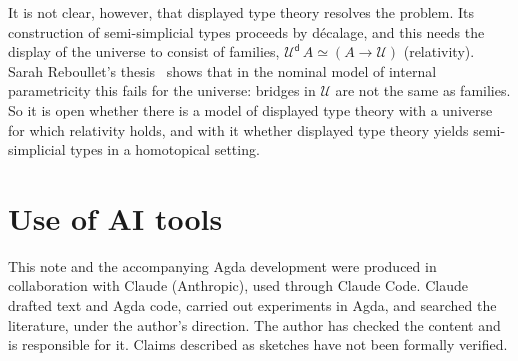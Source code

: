 \documentclass[11pt]{article}
\begin{document}
It is not clear, however, that displayed type theory resolves the problem.
Its construction of semi-simplicial types proceeds by d\'ecalage, and this
needs the display of the universe to consist of families,
$\mathcal U^{\mathsf d}\,A \simeq (A \to \mathcal U)$ (relativity). Sarah
Reboullet's thesis~\cite{reboullet} shows that in the nominal model of
internal parametricity this fails for the universe: bridges in $\mathcal U$
are not the same as families. So it is open whether there is a model of
displayed type theory with a universe for which relativity holds, and with it
whether displayed type theory yields semi-simplicial types in a homotopical
setting.

\section*{Use of AI tools}
This note and the accompanying Agda development were produced in
collaboration with Claude (Anthropic), used through Claude Code. Claude
drafted text and Agda code, carried out experiments in Agda, and searched the
literature, under the author's direction. The author has checked the content
and is responsible for it. Claims described as sketches have not been formally
verified.
\end{document}
